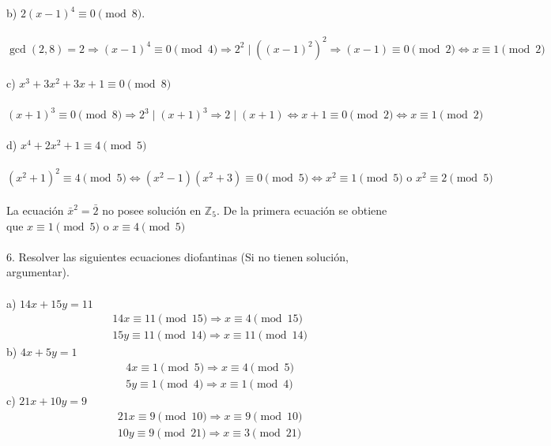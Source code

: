 \documentclass{article}
\begin{document}
\\
\\
b) $2(x-1)^{4} \equiv 0 \pmod{8}$.
\\
\\
$\gcd{(2,8)}=2 \Longrightarrow (x-1)^{4} \equiv 0 \pmod{4} \Longrightarrow 2^{2} \mid \left( (x-1)^{2}\right)^{2} \Longrightarrow (x-1) \equiv 0 \pmod{2} \Longleftrightarrow x \equiv 1 \pmod{2}$
\\
\\
c) $x^{3}+3x^{2}+3x+1 \equiv 0 \pmod{8}$
\\
\\
$(x+1)^{3} \equiv 0 \pmod{8} \Longrightarrow 2^{3} \mid (x+1)^{3} \Longrightarrow 2 \mid (x+1) \Longleftrightarrow x+1 \equiv 0 \pmod{2} \Longleftrightarrow x \equiv 1 \pmod{2}$
\\
\\
d) $x^{4}+2x^{2}+1 \equiv 4 \pmod{5}$
\\
\\
$(x^{2}+1)^{2} \equiv 4 \pmod{5} \Longleftrightarrow (x^{2}-1)(x^{2}+3) \equiv 0 \pmod{5} \Longleftrightarrow x^{2} \equiv 1 \pmod{5} \text{ o } x^{2} \equiv 2 \pmod{5}$
\\
\\
La ecuación $\bar{x}^{2} = \bar{2}$ no posee solución en $\mathbb{Z}_{5}$. De la primera ecuación se obtiene que $x \equiv 1 \pmod{5} \text{ o } x \equiv 4 \pmod{5}$
\\
\\
6. Resolver las siguientes ecuaciones diofantinas (Si no tienen solución, argumentar).
\\
\\
a) $14x+15y=11$
\begin{equation*}
\begin{aligned}
    &14x \equiv 11 \pmod{15} \Longrightarrow x \equiv 4 \pmod{15} \\
    &15y \equiv 11 \pmod{14} \Longrightarrow x \equiv 11 \pmod{14}
\end{aligned}
\end{equation*}
b) $4x+5y=1$
\begin{equation*}
\begin{aligned}
    &4x \equiv 1 \pmod{5} \Longrightarrow x \equiv 4 \pmod{5} \\
    &5y \equiv 1 \pmod{4} \Longrightarrow x \equiv 1 \pmod{4}
\end{aligned}
\end{equation*}
c) $21x + 10y =9$
\begin{equation*}
\begin{aligned}
    &21x \equiv 9 \pmod{10} \Longrightarrow x \equiv 9 \pmod{10} \\
    &10y \equiv 9 \pmod{21} \Longrightarrow x \equiv 3 \pmod{21}
\end{aligned} 
\end{equation*}
\end{document}
